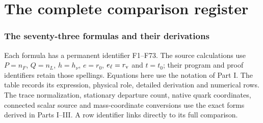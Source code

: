 \documentclass[aps,prx,onecolumn,10pt,notitlepage,nofootinbib,longbibliography]{revtex4-2}
\numberwithin{equation}{section}
\numberwithin{table}{section}
\begin{document}
\newpage
\part{The complete comparison register}\label{part:table}

\section{The seventy-three formulas and their derivations}
\label{sec:formulaindex}
Each formula has a permanent identifier F1--F73. The source calculations use $P=n_F$, $Q=n_L$, $h=h_\nu$, $e=r_0$, $e_\ell=r_{\rm v}$ and $t=t_0$; their program and proof identifiers retain those spellings. Equations here use the notation of Part I. The table records its
expression, physical role, detailed derivation and numerical rows. The
trace normalization, stationary departure count, native quark coordinates,
connected scalar source and mass-coordinate conversions use the exact forms
derived in Parts I--III. A row identifier links directly to its full comparison.
\begingroup\small
\setlength{\tabcolsep}{3pt}\renewcommand{\arraystretch}{1.08}
\end{document}
